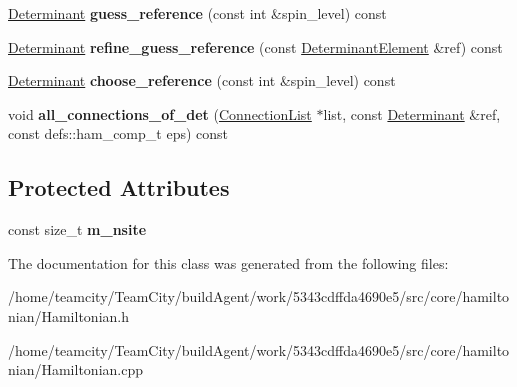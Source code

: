 \begin{DoxyCompactItemize}
\item 
\hyperlink{classDeterminant}{Determinant} {\bfseries guess\+\_\+reference} (const int \&spin\+\_\+level) const \hypertarget{classHamiltonian_a8285aa276fd0c82c0a4d5c0bfb092c01}{}\label{classHamiltonian_a8285aa276fd0c82c0a4d5c0bfb092c01}

\item 
\hyperlink{classDeterminant}{Determinant} {\bfseries refine\+\_\+guess\+\_\+reference} (const \hyperlink{classDeterminantElement}{Determinant\+Element} \&ref) const \hypertarget{classHamiltonian_a5baa86c26a113127513307fbb8507b88}{}\label{classHamiltonian_a5baa86c26a113127513307fbb8507b88}

\item 
\hyperlink{classDeterminant}{Determinant} {\bfseries choose\+\_\+reference} (const int \&spin\+\_\+level) const \hypertarget{classHamiltonian_a0fcd1d2527c37d2bd8072150b9624dfe}{}\label{classHamiltonian_a0fcd1d2527c37d2bd8072150b9624dfe}

\item 
void {\bfseries all\+\_\+connections\+\_\+of\+\_\+det} (\hyperlink{classHamiltonian_1_1ConnectionList}{Connection\+List} $\ast$list, const \hyperlink{classDeterminant}{Determinant} \&ref, const defs\+::ham\+\_\+comp\+\_\+t eps) const \hypertarget{classHamiltonian_ab2280ce8bff3fbd95a6c79200a57cda3}{}\label{classHamiltonian_ab2280ce8bff3fbd95a6c79200a57cda3}

\end{DoxyCompactItemize}
\subsection*{Protected Attributes}
\begin{DoxyCompactItemize}
\item 
const size\+\_\+t {\bfseries m\+\_\+nsite}\hypertarget{classHamiltonian_aec7c649696cbf62851f23d081fcb1e8d}{}\label{classHamiltonian_aec7c649696cbf62851f23d081fcb1e8d}

\end{DoxyCompactItemize}


The documentation for this class was generated from the following files\+:\begin{DoxyCompactItemize}
\item 
/home/teamcity/\+Team\+City/build\+Agent/work/5343cdffda4690e5/src/core/hamiltonian/Hamiltonian.\+h\item 
/home/teamcity/\+Team\+City/build\+Agent/work/5343cdffda4690e5/src/core/hamiltonian/Hamiltonian.\+cpp\end{DoxyCompactItemize}

